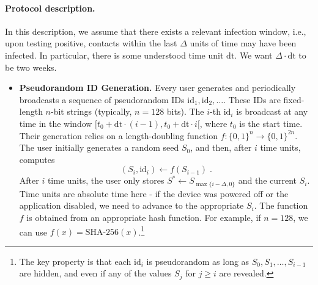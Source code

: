 \documentclass{article}
\begin{document}
\newcommand{\id}{\mathrm{id}}
\newcommand{\dt}{\mathrm{dt}}
\paragraph{Protocol description.} In this description, we assume that there exists a relevant infection window, i.e., upon testing positive, contacts within the last $\Delta$ units of time may have been infected. In particular, there is some understood time unit $\dt$. We want $\Delta \cdot \dt$ to be two weeks. 


\begin{itemize}
    \item {\bf Pseudorandom ID Generation.} Every user generates and periodically broadcasts a sequence of pseudorandom IDs $\id_1, \id_2, \ldots$. These IDs are fixed-length $n$-bit strings (typically, $n = 128$ bits). The $i$-th $\id_i$ is broadcast at any time in the window $[t_0 + \dt\cdot (i-1), t_0 + \dt\cdot i[$, where $t_0$ is the start time. Their generation relies on a length-doubling function $f: \{0,1\}^n \to \{0,1\}^{2n}$. The user initially generates a random seed $S_0$, and then, after $i$ time units, computes
\begin{displaymath}
(S_i, \id_i) \gets f(S_{i-1}) \;.
\end{displaymath}
After $i$ time units, the user only stores $S^* \gets S_{\max\{i-\Delta,0\}}$ and the current $S_i$. Time units are absolute time here - if the device was powered off or the application disabled, we need to advance to the appropriate $S_i$. The function $f$ is obtained from an appropriate hash function. For example, if $n = 128$, we can use $f(x) = \textrm{SHA-256}(x)$.\footnote{The key property is that each $\id_i$ is pseudorandom  as long as $S_0, S_1, \ldots, S_{i-1}$ are hidden, and even if any of the values $S_j$ for $j \geq i$ are revealed.}


\end{itemize}
\end{document}

